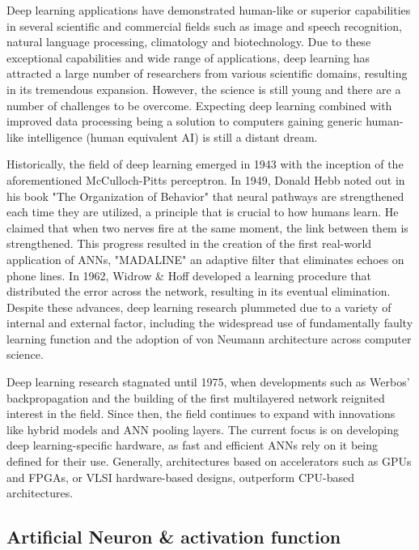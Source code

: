Deep learning applications have demonstrated human-like or superior capabilities in several scientific and commercial fields such as image\cite{Alexnet} and speech\cite{limits_speech_recognition} recognition, natural language processing\cite{natural_language}, climatology\cite{Climatology} and biotechnology\cite{biotechnology}. Due to these exceptional capabilities and wide range of applications, deep learning has attracted a large number of researchers from various scientific domains, resulting in its tremendous expansion. However, the science is still young and there are a number of challenges to be overcome. Expecting deep learning combined with improved data processing being a solution to computers gaining generic human-like intelligence (human equivalent AI) is still a distant dream.\cite{dl_evolution}

Historically, the field of deep learning emerged in 1943 with the inception of the aforementioned McCulloch-Pitts perceptron. In 1949, Donald Hebb noted out in his book "The Organization of Behavior" that neural pathways are strengthened each time they are utilized, a principle that is crucial to how humans learn. He claimed that when two nerves fire at the same moment, the link between them is strengthened. This progress resulted in the creation of the first real-world application of ANNs, "MADALINE" an adaptive filter that eliminates echoes on phone lines. In 1962, Widrow \& Hoff developed a learning procedure that distributed the error across the network, resulting in its eventual elimination. Despite these advances, deep learning research plummeted due to a variety of internal and external factor, including the widespread use of fundamentally faulty learning function and the adoption of von Neumann architecture across computer science.

Deep learning research stagnated until 1975, when developments such as Werbos' backpropagation and the building of the first multilayered network reignited interest in the field. Since then, the field continues to expand with innovations like hybrid models and ANN pooling layers. The current focus is on developing deep learning-specific hardware, as fast and efficient ANNs rely on it being defined for their use. Generally, architectures based on accelerators such as GPUs and FPGAs, or VLSI hardware-based designs, outperform CPU-based architectures. \cite{dl_history}


\subsection{Artificial Neuron \& activation function}


